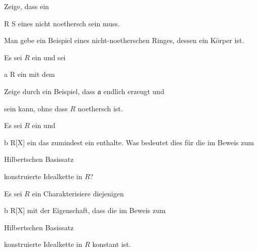 {}
{




Zeige, dass ein

\mavergleichskette
{\vergleichskette
{R
}
{ \subseteq }{ S
}
{  }{
}
{    }{
}
{   }{
}
}
{}{}{}
eines
nicht noethersch sein muss.




}
{} {}


{}
{




Man gebe ein Beispiel eines nicht-noetherschen Ringes, dessen 
ein Körper ist.




}
{} {}


{}
{




Es sei $R$ ein
und sei

\mavergleichskette
{\vergleichskette
{ {\mathfrak a}
}
{ \subset }{ R
}
{  }{
}
{    }{
}
{   }{
}
}
{}{}{}
ein
 {} {}
mit dem

 Zeige durch ein Beispiel, dass ${\mathfrak a}$ endlich erzeugt und

sein kann, ohne dass $R$ noethersch ist.




}
{} {}


{}
{




Es sei $R$ ein
und

\mavergleichskette
{\vergleichskette
{ {\mathfrak b}
}
{ \subseteq }{ R[X]
}
{  }{
}
{    }{
}
{   }{
}
}
{}{}{}
ein
das zumindest ein
enthalte. Was bedeutet dies für die im Beweis zum

Hilbertschen Basissatz

konstruierte Idealkette in $R$?




}
{} {}


{}
{




Es sei $R$ ein
Charakterisiere diejenigen

\mavergleichskette
{\vergleichskette
{ {\mathfrak b}
}
{ \subseteq }{ R[X]
}
{  }{
}
{    }{
}
{   }{
}
}
{}{}{}
mit der Eigenschaft, dass die im Beweis zum

Hilbertschen Basissatz

konstruierte Idealkette in $R$ konstant ist.




}
{} {}


